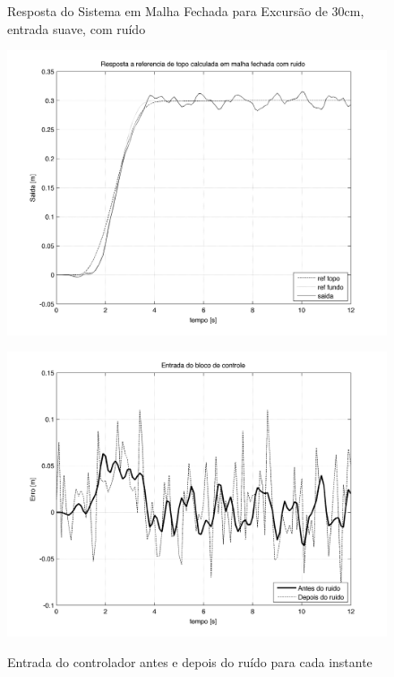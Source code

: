 \begin{figure}[!htb]
    \centering
    \begin{minipage}{.45\textwidth}
        \centering
        \caption{Resposta do Sistema em Malha Fechada para Excursão de 30cm, entrada suave, com ruído}
        \includegraphics[width=1\linewidth]{figs/resultados/simulacao/respostaMalhaAbertaRefTopoRuido}
        \label{respostaMalhaAbertaRefTopoRuido}
    \end{minipage}%
    \hspace{0.1cm}
    \begin{minipage}{0.45\textwidth}
        \centering
        \caption{Entrada do controlador antes e depois do ruído para cada instante}
        \includegraphics[width=1\linewidth]{figs/resultados/simulacao/entradaControladorYERR}
        \label{entradaControladorYERR}
    \end{minipage}
\end{figure}


